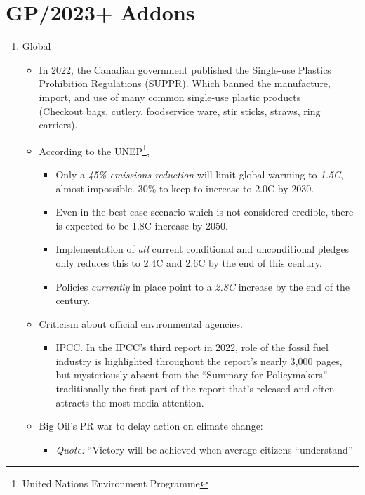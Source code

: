 \documentclass[oneside]{book}
\begin{document}
\section{GP/2023+ Addons}
    \begin{enumerate}
        \item Global
        \begin{itemize}
            \item In 2022, the Canadian government published the Single-use Plastics Prohibition Regulations (SUPPR). Which banned the manufacture, import, and use of many common single-use plastic products\\ 
            \footnotesize(Checkout bags, cutlery, foodservice ware, stir sticks, straws, ring carriers)\normalsize.  
            \item According to the UNEP\footnote{United Nations Environment Programme
            },
            \begin{itemize}
                \item Only a \emph{45\% emissions reduction} will limit global warming to \emph{1.5C}, almost impossible. 30\% to keep to increase to 2.0C by 2030.
                \item Even in the best case scenario which is not considered credible, there is expected to be 1.8C increase by 2050.
                \item Implementation of \emph{all} current conditional and unconditional pledges only reduces this to 2.4C and 2.6C by the end of this century.
                \item Policies \emph{currently} in place point to a \emph{2.8C} increase by the end of the century.
            \end{itemize}
            \item Criticism about official environmental agencies.
            \begin{itemize}
                \item IPCC. In the IPCC's third report in 2022, role of the fossil fuel industry is highlighted throughout the report's nearly 3,000 pages, but mysteriously absent from the ``Summary for Policymakers'' --- traditionally the first part of the report that's released and often attracts the most media attention.
            \end{itemize}
            \item Big Oil's PR war to delay action on climate change:
            \begin{itemize}
                \item \textit{Quote:} ``Victory will be achieved when average citizens “understand”

\end{itemize}
\end{itemize}
\end{enumerate}
\end{document}
